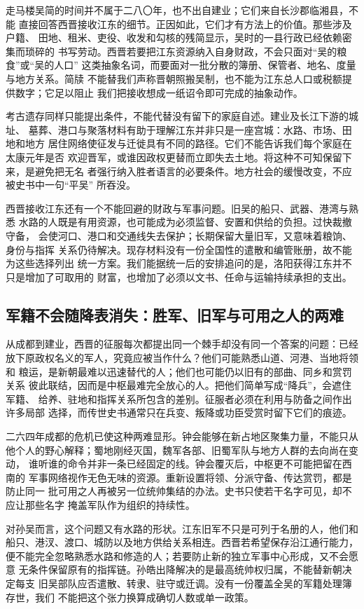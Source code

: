 走马楼吴简的时间并不属于二八〇年，也不出自建业；它们来自长沙郡临湘县，不能
直接回答西晋接收江东的细节。正因如此，它们才有方法上的价值。那些涉及户籍、
田地、租米、吏役、收发和勾核的残简显示，吴时的一县行政已经依赖密集而琐碎的
书写劳动。西晋若要把江东资源纳入自身财政，不会只面对“吴的粮食”或“吴的人口”
这类抽象名词，而要面对一批分散的簿册、保管者、地名、度量与地方关系。简牍
不能替我们声称晋朝照搬吴制，也不能为江东总人口或税额提供数字；它足以阻止
我们把接收想成一纸诏令即可完成的抽象动作。

考古遗存同样只能提出条件，不能代替没有留下的家庭自述。建业及长江下游的城址、
墓葬、港口与聚落材料有助于理解江东并非只是一座宫城：水路、市场、田地和地方
居住网络使征发与迁徙具有不同的路径。它们不能告诉我们每个家庭在太康元年是否
欢迎晋军，或谁因政权更替而立即失去土地。将这种不可知保留下来，是避免把无名
者强行纳入胜者语言的必要条件。地方社会的缓慢改变，不应被史书中一句“平吴”
所吞没。

西晋接收江东还有一个不能回避的财政与军事问题。旧吴的船只、武器、港湾与熟悉
水路的人既是有用资源，也可能成为必须监督、安置和供给的负担。过快裁撤守备，
会使河口、港口和交通线失去保护；长期保留大量旧军，又意味着粮饷、身份与指挥
关系仍待解决。现存材料没有一份全国性的遣散和编管账册，故不能为这些选择列出
统一方案。我们能据统一后的安排追问的是，洛阳获得江东并不只是增加了可取用的
财富，也增加了必须以文书、任命与运输持续承担的支出。

\subsection{军籍不会随降表消失：胜军、旧军与可用之人的两难}

从成都到建业，西晋的征服每次都提出同一个棘手却没有同一个答案的问题：已经
放下原政权名义的军人，究竟应被当作什么？他们可能熟悉山道、河港、当地将领和
粮运，是新朝最难以迅速替代的人；他们也可能仍以旧有的部曲、同乡和赏罚关系
彼此联结，因而是中枢最难完全放心的人。把他们简单写成“降兵”，会遮住军籍、
给养、驻地和指挥关系所包含的差别。征服者必须在利用与防备之间作出许多局部
选择，而传世史书通常只在兵变、叛降或功臣受赏时留下它们的痕迹。

二六四年成都的危机已使这种两难显形。钟会能够在新占地区聚集力量，不能只从
他个人的野心解释；蜀地刚经灭国，魏军各部、旧蜀军队与地方人群的去向尚在变动，
谁听谁的命令并非一条已经固定的线。钟会覆灭后，中枢更不可能把留在西南的
军事网络视作无色无味的资源。重新设置将领、分派守备、传达赏罚，都是防止同一
批可用之人再被另一位统帅集结的办法。史书只使若干名字可见，却不应让那些名字
掩盖军队作为组织的持续性。

对孙吴而言，这个问题又有水路的形状。江东旧军不只是可列于名册的人，他们和
船只、港汊、渡口、城防以及地方供给关系相连。西晋若希望保存沿江通行能力，
便不能完全忽略熟悉水路和修造的人；若要防止新的独立军事中心形成，又不会愿意
无条件保留原有的指挥链。孙皓出降解决的是最高统帅权归属，不能替新朝决定每支
旧吴部队应否遣散、转隶、驻守或迁调。没有一份覆盖全吴的军籍处理簿存世，我们
不能把这个张力换算成确切人数或单一政策。

